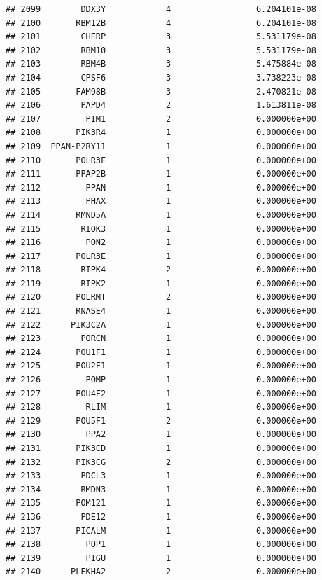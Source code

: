 \documentclass[
]{article}
\begin{document}
\begin{verbatim}
## 2099        DDX3Y            4                 6.204101e-08
## 2100       RBM12B            4                 6.204101e-08
## 2101        CHERP            3                 5.531179e-08
## 2102        RBM10            3                 5.531179e-08
## 2103        RBM4B            3                 5.475884e-08
## 2104        CPSF6            3                 3.738223e-08
## 2105       FAM98B            3                 2.470821e-08
## 2106        PAPD4            2                 1.613811e-08
## 2107         PIM1            2                 0.000000e+00
## 2108       PIK3R4            1                 0.000000e+00
## 2109  PPAN-P2RY11            1                 0.000000e+00
## 2110       POLR3F            1                 0.000000e+00
## 2111       PPAP2B            1                 0.000000e+00
## 2112         PPAN            1                 0.000000e+00
## 2113         PHAX            1                 0.000000e+00
## 2114       RMND5A            1                 0.000000e+00
## 2115        RIOK3            1                 0.000000e+00
## 2116         PON2            1                 0.000000e+00
## 2117       POLR3E            1                 0.000000e+00
## 2118        RIPK4            2                 0.000000e+00
## 2119        RIPK2            1                 0.000000e+00
## 2120       POLRMT            2                 0.000000e+00
## 2121       RNASE4            1                 0.000000e+00
## 2122      PIK3C2A            1                 0.000000e+00
## 2123        PORCN            1                 0.000000e+00
## 2124       POU1F1            1                 0.000000e+00
## 2125       POU2F1            1                 0.000000e+00
## 2126         POMP            1                 0.000000e+00
## 2127       POU4F2            1                 0.000000e+00
## 2128         RLIM            1                 0.000000e+00
## 2129       POU5F1            2                 0.000000e+00
## 2130         PPA2            1                 0.000000e+00
## 2131       PIK3CD            1                 0.000000e+00
## 2132       PIK3CG            2                 0.000000e+00
## 2133        PDCL3            1                 0.000000e+00
## 2134        RMDN3            1                 0.000000e+00
## 2135       POM121            1                 0.000000e+00
## 2136        PDE12            1                 0.000000e+00
## 2137       PICALM            1                 0.000000e+00
## 2138         POP1            1                 0.000000e+00
## 2139         PIGU            1                 0.000000e+00
## 2140      PLEKHA2            2                 0.000000e+00

\end{verbatim}
\end{document}

